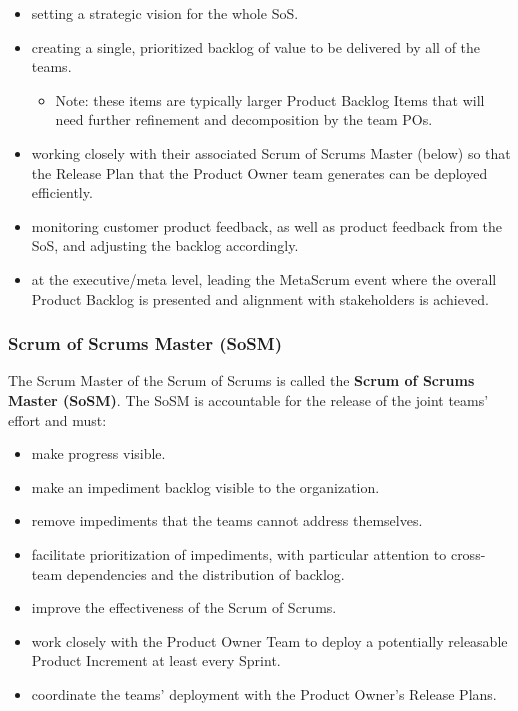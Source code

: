 \documentclass[12pt,a4paper,parskip=full]{scrartcl}
\begin{document}
\begin{itemize}
	\item setting a strategic vision for the whole SoS.
	\item creating a single, prioritized backlog of value to be delivered by all of the teams.
	\begin{itemize}
		\item Note: these items are typically larger Product Backlog Items that will need further refinement and decomposition by the team POs.
	\end{itemize}
	\item working closely with their associated Scrum of Scrums Master (below) so that the Release Plan that the Product Owner team generates can be deployed efficiently.
	\item monitoring customer product feedback, as well as product feedback from the SoS, and adjusting the backlog accordingly.
	\item at the executive/meta level, leading the MetaScrum event where the overall Product Backlog is presented and alignment with stakeholders is achieved.
\end{itemize}



\subsubsection{Scrum of Scrums Master (SoSM)}

The Scrum Master of the Scrum of Scrums is called the \textbf{Scrum of Scrums Master (SoSM)}. The SoSM is accountable for the release of the joint teams' effort and must:

\begin{itemize}
	\item make progress visible.
	\item make an impediment backlog visible to the organization.
	\item remove impediments that the teams cannot address themselves.
	\item facilitate prioritization of impediments, with particular attention to cross-team dependencies and the distribution of backlog.
	\item improve the effectiveness of the Scrum of Scrums.
	\item work closely with the Product Owner Team to deploy a potentially releasable Product Increment at least every Sprint.
	\item coordinate the teams' deployment with the Product Owner's Release Plans.
\end{itemize}
\end{document}
